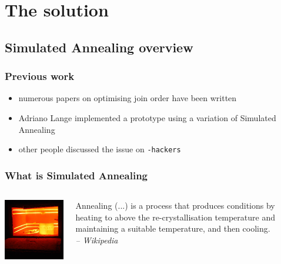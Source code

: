 \documentclass{beamer}
\begin{document}
\section{The solution}

\subsection{Simulated Annealing overview}

\begin{frame}
  \frametitle{Previous work}

  \begin{itemize}
  \item numerous papers on optimising join order have been written
  \item Adriano Lange implemented a prototype using a variation of Simulated
    Annealing
  \item other people discussed the issue on \texttt{-hackers}
  \end{itemize}
\end{frame}

\begin{frame}
  \frametitle{What is Simulated Annealing}

  \begin{columns}
    \begin{column}{7cm}
      \includegraphics[width=7cm]{furnace.png}
    \end{column}
    \begin{column}{5cm}
      Annealing (...) is a process that produces conditions by heating to above
      the re-crystallisation temperature and maintaining a suitable
      temperature, and then cooling.\\
      \hfill\textit{-- Wikipedia}
    \end{column}
  \end{columns}
\end{frame}
\end{document}
